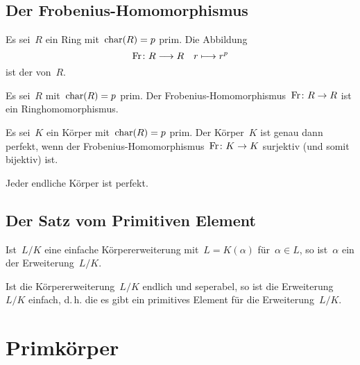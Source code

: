 \subsection{Der Frobenius-Homomorphismus}

\begin{definition}
  Es sei~$R$ ein Ring mit~$\operatorname{char}(R) = p$ prim.
  Die Abbildung
  \[
    \Fr
    \colon
    R \to R
    \quad
    r \mapsto r^p
  \]
  ist der  von~$R$.
\end{definition}

\begin{lemma}
  Es sei~$R$ mit~$\operatorname{char}(R) = p$ prim.
  Der Frobenius-\hspace{0pt}Homomorphismus~$\Fr \colon R \to R$ ist ein Ringhomomorphismus.
\end{lemma}

\begin{proposition}
  Es sei~$K$ ein Körper mit~$\operatorname{char}(R) = p$ prim.
  Der Körper~$K$ ist genau dann perfekt, wenn der Frobenius-Homomorphismus~$\Fr \colon K \to K$ surjektiv (und somit bijektiv) ist. 
\end{proposition}

\begin{corollary}
  Jeder endliche Körper ist perfekt.
\end{corollary}



\subsection{Der Satz vom Primitiven Element}

\begin{definition}
  Ist~$L/K$ eine einfache Körpererweiterung mit~$L = K(\alpha)$ für~$\alpha \in L$, so ist~$\alpha$ ein  der Erweiterung~$L/K$.
\end{definition}

\begin{theorem}
  Ist die Körpererweiterung~$L/K$ endlich und seperabel, so ist die Erweiterung~$L/K$ einfach, d.\,h. die es gibt ein primitives Element für die Erweiterung~$L/K$.
\end{theorem}





\section{Primkörper}

